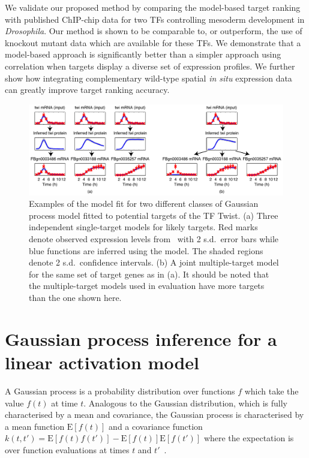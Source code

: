 \documentclass{pnastwo}
\begin{document}
\begin{article}
We validate our proposed method by comparing the model-based target
ranking with published ChIP-chip data for two TFs controlling
mesoderm development in \emph{Drosophila}. Our method is shown to be comparable
to, or outperform, the use of knockout mutant data which are available
for these TFs. We demonstrate that a model-based approach is significantly
better than a simpler approach using correlation when targets display a diverse set of expression profiles. We further show how integrating complementary wild-type spatial
{\em in situ} expression data can greatly improve target ranking accuracy. 

\begin{figure}[tb]
  \centering
  \includegraphics{fig1}
  \caption{Examples of the model fit for two different classes of 
    Gaussian process model fitted to potential targets of the TF Twist. (a) Three independent single-target models
    for likely targets. Red marks denote observed expression
    levels from~\cite{Tomancak2002} with 2 s.d.\ error bars while blue functions are inferred
    using the model.  The shaded regions denote 2 s.d.\ confidence
    intervals. (b) A joint multiple-target model for
    the same set of target genes as in (a). It should be noted that
    the multiple-target models used in evaluation have more targets
    than the one shown here.\label{fig:gpdisim_models}
}
\end{figure}

\section{Gaussian process inference for a linear activation model}

A Gaussian process is a probability distribution over
functions $f$ which take the value $f(t)$ at time
$t$. Analogous to the Gaussian distribution, which is fully
characterised by a mean and covariance, the Gaussian process is
characterised by a mean function $\mathrm{E}[f(t)]$ and a covariance
function $k(t,t')=\mathrm{E}[f(t)f(t')]-\mathrm{E}[f(t)]\mathrm{E}[f(t')]$
where the expectation is over function evaluations at times $t$ and
$t'$~\cite{Rasmussen2006}.


\end{article}
\end{document}
